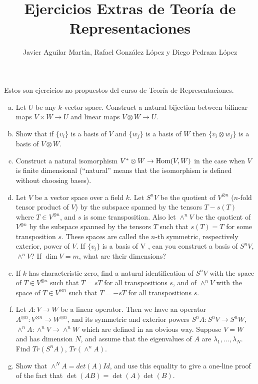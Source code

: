 \documentclass[twoside]{article}
\begin{document}
\title{Ejercicios Extras de Teoría de Representaciones}
\author{Javier Aguilar Martín, Rafael González López y Diego Pedraza López}
\maketitle

Estos son ejercicios no propuestos del curso de Teoría de Representaciones.

\begin{ejercicio}{1.49}
\mbox{}
\begin{enumerate}[(a)]
\item Let $U$ be any $k$-vector space.
Construct a natural bijection between bilinear maps $V \times W \to U$ and linear maps $V \otimes W \to U$.
\item Show that if $\{v_i\}$ is a basis of $V$ and $\{w_j\}$ is a basis of $W$ then $\{v_i \otimes w_j\}$ is a basis of $V \otimes W$.
\item Construct a natural isomorphism $V^* \otimes W \to \operatorname{Hom}(V, W)$ in the case when $V$ is finite dimensional (``natural'' means that the isomorphism is defined without choosing bases).

\item Let $V$ be a vector space over a field $k$.
Let $S^nV$ be the quotient of $V^{\otimes n}$ ($n$-fold tensor product of $V$) by the subspace spanned by the tensors $T - s(T)$ where $T \in V^{\otimes n}$, and $s$ is some transposition.
Also let $\wedge^n V$ be the quotient of $V^{⊗n}$ by the subspace spanned by the tensors $T$ such that $s(T) = T$ for some transposition $s$.
These spaces are called the $n$-th symmetric, respectively exterior, power of $V$.
If $\{v_i\}$ is a basis of V , can you construct a basis of $S^n V$, $\wedge^n V$?
If $\dim V = m$, what are their dimensions?
\item If $k$ has characteristic zero, find a natural identification of $S^n V$ with the space of $T ∈ V^{⊗n}$ such that $T = sT$ for all transpositions $s$, and of $\wedge^n V$ with the space of $T ∈ V^{⊗n}$ such that $T = -sT$ for all transpositions $s$.
\item Let $A : V \to W$ be a linear operator.
Then we have an operator $A^{⊗n} : V^{⊗n} \to W^{⊗n}$, and its symmetric and exterior powers $S^n A : S^n V \to S^n W$, $\wedge^n A : \wedge^n V → \wedge^n W$ which are defined in an obvious way.
Suppose $V = W$ and has dimension $N$, and assume that the eigenvalues of $A$ are $λ_1, \dots, λ_N$.
Find $Tr(S^n A)$, $Tr(\wedge^n A)$.
\item Show that $\wedge^N A = det(A)Id$, and use this equality to give a one-line proof of the fact that $\det(AB) = \det(A) \det(B)$.
\end{enumerate}
\end{ejercicio}
\end{document}
